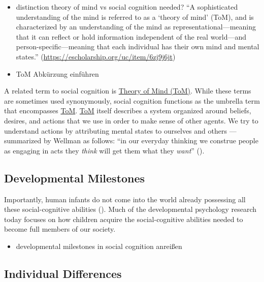 \documentclass[
]{scrbook}
\providecommand{\tightlist}{%
  \setlength{\itemsep}{0pt}\setlength{\parskip}{0pt}}
\begin{document}
\begin{itemize}
\tightlist
\item
  distinction theory of mind vs social cognition needed? ``A sophisticated understanding of the mind is referred to as a `theory of mind' (ToM), and is characterized by an understanding of the mind as representational---meaning that it can reflect or hold information independent of the real world---and person-specific---meaning that each individual has their own mind and mental states.'' (\url{https://escholarship.org/uc/item/6zj9j6jt})
\item
  ToM Abkürzung einführen
\end{itemize}

A related term to social cognition is \hyperref[acronyms_ToM]{Theory of Mind (ToM)}. While these terms are sometimes used synonymously, social cognition functions as the umbrella term that encompasses \hyperref[acronyms_ToM]{ToM}. \hyperref[acronyms_ToM]{ToM} itself describes a system organized around beliefs, desires, and actions that we use in order to make sense of other agents. We try to understand actions by attributing mental states to ourselves and others --- summarized by Wellman as follows: ``in our everyday thinking we construe people as engaging in acts they \emph{think} will get them what they \emph{want}'' ().

\subsection{Developmental Milestones}\label{developmental-milestones}

Importantly, human infants do not come into the world already possessing all these social-cognitive abilities (). Much of the developmental psychology research today focuses on how children acquire the social-cognitive abilities needed to become full members of our society.

\begin{itemize}
\tightlist
\item
  developmental milestones in social cognition anreißen
\end{itemize}

\subsection{Individual Differences}\label{individual-differences}
\end{document}

